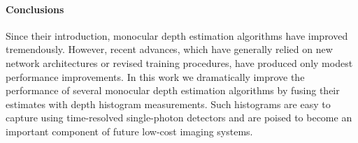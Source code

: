 \paragraph{Conclusions}
Since their introduction, monocular depth estimation algorithms have improved tremendously.  However, recent advances, which have generally relied on new network architectures or revised training procedures, have produced only modest performance improvements. 
In this work we dramatically improve the performance of several monocular depth estimation algorithms by fusing their estimates with depth histogram measurements. 
Such histograms are easy to capture using time-resolved single-photon detectors and are poised to become an important component of future low-cost imaging systems.
 
